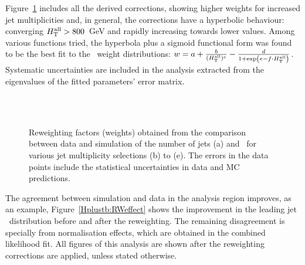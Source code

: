 Figure~\ref{Hplustb:RWfactors} includes all the derived corrections, showing higher weights for increased jet multiplicities and, in general, the \HTall corrections have a hyperbolic behaviour: converging $H_{\text{T}}^{\text{all}} > 800$~GeV and rapidly increasing towards lower values. Among various functions tried, the hyperbola plus a sigmoid functional form was found to be the best fit to the \HTall\ weight distributions: $w=a+\frac{b}{(H_{\text{T}}^{\text{all}})^c} - \frac{d}{1+\exp(e-f\cdot H_{\text{T}}^{\text{all}})}$. Systematic uncertainties are included in the analysis extracted from the eigenvalues of the fitted parameters' error matrix.

\begin{figure}[htb]
    \RawFloats
    \begin{center}
     \\ 
      \\
    \caption{Reweighting factors (weights) obtained from the comparison between data and simulation of the number of jets (a) and \HTall\ for various jet multiplicity selections (b) to (e).
    The errors in the data points include the statistical uncertainties in data and MC predictions.}
    \label{Hplustb:RWfactors}
\end{center}
\end{figure}

The agreement between simulation and data in the analysis region improves, as an example, Figure~\ref{Hplustb:RWeffect} shows the improvement in the leading jet \pT\ distribution before and after the reweighting. The remaining disagreement is specially from normalisation effects, which are obtained in the combined likelihood fit. All figures of this analysis are shown after the reweighting corrections are applied, unless stated otherwise.

